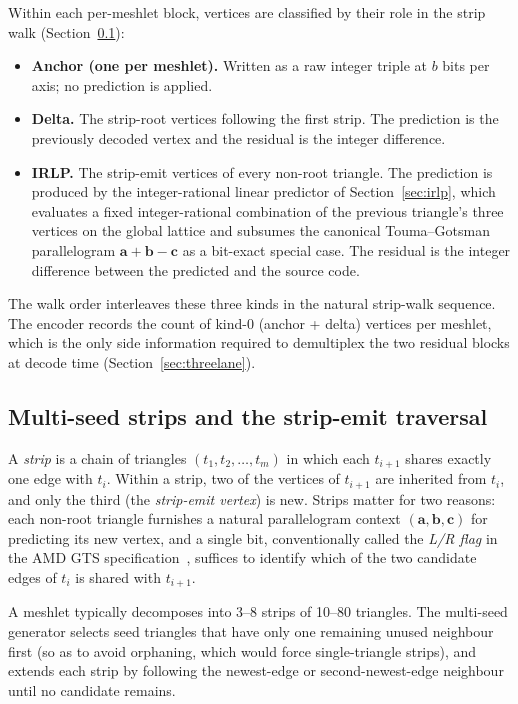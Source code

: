 \documentclass[pdflatex,sn-vancouver-num]{sn-jnl}%
\theoremstyle{thmstyleone}%
\theoremstyle{thmstyletwo}%
\theoremstyle{thmstylethree}%
\begin{document}
Within each per-meshlet block, vertices are classified by their role in the strip walk (Section~\ref{sec:strips}):

\begin{itemize}
\item \textbf{Anchor (one per meshlet).} Written as a raw integer triple at $b$ bits per axis; no prediction is applied.
\item \textbf{Delta.} The strip-root vertices following the first strip. The prediction is the previously decoded vertex and the residual is the integer difference.
\item \textbf{IRLP.} The strip-emit vertices of every non-root triangle. The prediction is produced by the integer-rational linear predictor of Section~\ref{sec:irlp}, which evaluates a fixed integer-rational combination of the previous triangle's three vertices on the global lattice and subsumes the canonical Touma--Gotsman parallelogram $\mathbf{a} + \mathbf{b} - \mathbf{c}$ as a bit-exact special case. The residual is the integer difference between the predicted and the source code.
\end{itemize}

The walk order interleaves these three kinds in the natural strip-walk sequence. The encoder records the count of kind-0 (anchor + delta) vertices per meshlet, which is the only side information required to demultiplex the two residual blocks at decode time (Section~\ref{sec:threelane}).

\subsection{Multi-seed strips and the strip-emit traversal}\label{sec:strips}

A \emph{strip} is a chain of triangles $(t_1, t_2, \ldots, t_m)$ in which each $t_{i+1}$ shares exactly one edge with $t_i$. Within a strip, two of the vertices of $t_{i+1}$ are inherited from $t_i$, and only the third (the \emph{strip-emit vertex}) is new. Strips matter for two reasons: each non-root triangle furnishes a natural parallelogram context $(\mathbf{a}, \mathbf{b}, \mathbf{c})$ for predicting its new vertex, and a single bit, conventionally called the \emph{L/R flag} in the AMD GTS specification~\cite{ref01_amd_dgf_hpg2024}, suffices to identify which of the two candidate edges of $t_i$ is shared with $t_{i+1}$.

A meshlet typically decomposes into 3--8 strips of 10--80 triangles. The multi-seed generator selects seed triangles that have only one remaining unused neighbour first (so as to avoid orphaning, which would force single-triangle strips), and extends each strip by following the newest-edge or second-newest-edge neighbour until no candidate remains.
\end{document}
